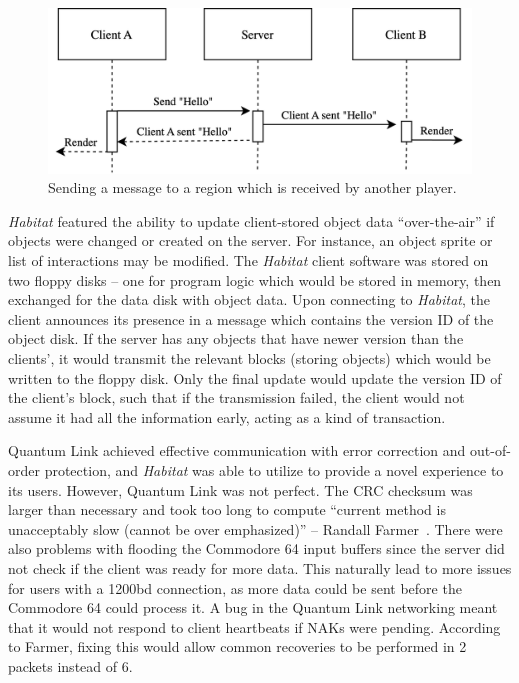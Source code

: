 \begin{figure}[h]
  \includegraphics[width=\columnwidth]{figures/msg}
  \caption{Sending a message to a region which is received by another player.}
  \Description[]{}
\end{figure}

\textit{Habitat} featured the ability to update client-stored object data ``over-the-air'' if objects were changed or created on the server. For instance, an object sprite or list of interactions may be modified. The \textit{Habitat} client software was stored on two floppy disks -- one for program logic which would be stored in memory, then exchanged for the data disk with object data. Upon connecting to \textit{Habitat}, the client announces its presence in a message which contains the version ID of the object disk. If the server has any objects that have newer version than the clients', it would transmit the relevant blocks (storing objects) which would be written to the floppy disk. Only the final update would update the version ID of the client's block, such that if the transmission failed, the client would not assume it had all the information early, acting as a kind of transaction.

Quantum Link achieved effective communication with error correction and out-of-order protection, and \textit{Habitat} was able to utilize to provide a novel experience to its users. However, Quantum Link was not perfect. The CRC checksum was larger than necessary and took too long to compute ``current method is unacceptably slow (cannot be over emphasized)'' -- Randall Farmer~\cite{habitatsrc}. There were also problems with flooding the Commodore 64 input buffers since the server did not check if the client was ready for more data. This naturally lead to more issues for users with a 1200bd connection, as more data could be sent before the Commodore 64 could process it. A bug in the Quantum Link networking meant that it would not respond to client heartbeats if NAKs were pending. According to Farmer, fixing this would allow common recoveries to be performed in 2 packets instead of 6.
